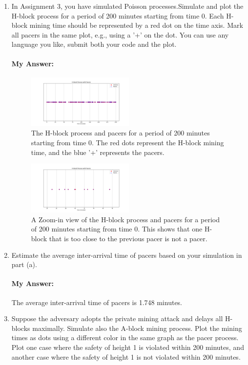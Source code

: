 \documentclass{article}
\begin{document}
\begin{enumerate}[label=(\alph*)]
    \item In Assignment 3, you have simulated Poisson processes.Simulate and plot the H-block process for a period of 200 minutes starting from time 0. Each H-block mining time should be represented by a red dot on the time axis. Mark all pacers in the same plot, e.g., using a '+' on the dot. You can use any language you like, submit both your code and the plot.
        \paragraph*{My Answer:}
        
        \begin{figure}[h]
            \centering
            \includegraphics*[width=0.5\textwidth]{pacers1.png}
            \caption{The H-block process and pacers for a period of 200 minutes starting from time 0. The red dots represent the H-block mining time, and the blue '+' represents the pacers.}
        \end{figure}
        \begin{figure}[h]
            \centering
            \includegraphics*[width=0.5\textwidth]{pacers2.png}
            \caption{A Zoom-in view of the H-block process and pacers for a period of 200 minutes starting from time 0. This shows that one H-block that is too close to the previous pacer is not a pacer.}
        \end{figure}
        
    \item Estimate the average inter-arrival time of pacers based on your simulation in part (a).
        \paragraph*{My Answer:} The average inter-arrival time of pacers is 1.748 minutes.
    \item Suppose the adversary adopts the private mining attack and delays all H-blocks maximally. Simulate also the A-block mining process. Plot the mining times as dots using a different color in the same graph as the pacer process. Plot one case where the safety of height 1 is violated within 200 minutes, and another case where the safety of height 1 is not violated within 200 minutes.

\end{enumerate}
\end{document}
